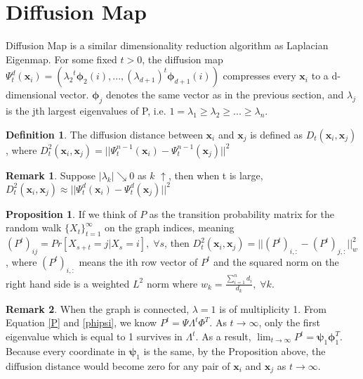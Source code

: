 \documentclass[11pt]{article}
\theoremstyle{definition}
\newtheorem{definition}{Definition}
\newtheorem{remark}{Remark}
\newtheorem{prop}[theorem]{Proposition}
\begin{document}
\section{Diffusion Map}
Diffusion Map \cite{coifman2005geometric}\cite{coifman2006diffusion} is a similar dimensionality reduction algorithm as Laplacian Eigenmap. For some fixed $t>0$, the diffusion map $\Psi_t^d(\boldsymbol{x}_i) = ({\lambda_{2}}^t\boldsymbol{\phi}_2(i), ..., (\lambda_{d+1})^t\boldsymbol{\phi}_{d+1}(i))$ compresses every $\boldsymbol{x}_i$ to a d-dimensional vector. $\boldsymbol{\phi}_{j}$ denotes the same vector as in the previous section, and $\lambda_j$ is the jth largest eigenvalues of P, i.e. $1 = \lambda_1 \geq \lambda_2 \geq ... \geq \lambda_n$.
\begin{definition}
	The diffusion distance between $\boldsymbol{x}_i$ and $\boldsymbol{x}_j$ is defined as $D_t(\boldsymbol{x}_i, \boldsymbol{x}_j)$, where $D_t^2(\boldsymbol{x}_i, \boldsymbol{x}_j) = ||\Psi_t^{n-1}(\boldsymbol{x}_i) - \Psi_t^{n-1}(\boldsymbol{x}_j)||^2$
\end{definition}
\begin{remark}
	Suppose $|\lambda_k| \searrow 0$ as $k$ $\uparrow$, then when t is large, $D_t^2(\boldsymbol{x}_i, \boldsymbol{x}_j) \approx ||\Psi_t^{d}(\boldsymbol{x}_i) - \Psi_t^{d}(\boldsymbol{x}_j)||^2$
\end{remark}
\begin{prop}
\label{diffusion}
If we think of $P$ as the transition probability matrix for the random walk $\{X_t\}_{t=1}^\infty$ on the graph indices, meaning $(P^t)_{ij} = Pr[X_{s+t} = j | X_s = i],\; \forall s$, then $D_t^2(\boldsymbol{x}_i, \boldsymbol{x}_j) = ||(P^t)_{i,:} - (P^t)_{j,:}||_w^2$, where $(P^t)_{i,:}$ means the ith row vector of $P^t$ and the squared norm on the right hand side is a weighted $L^2$ norm where $w_k = \frac{\sum_{i=1}^{n}d_i}{d_k}, \;\forall k$.
\end{prop}
\begin{remark}
When the graph is connected, $\lambda = 1$ is of multiplicity 1. From Equation \ref{P} and \ref{phipsi}, we know $P^t = \Psi \Lambda^t \Phi^T$. As $t \rightarrow \infty$, only the first eigenvalue which is equal to 1 survives in $\Lambda^t$. As a result, $\lim_{t \rightarrow \infty} P^t = \boldsymbol{\psi}_1\boldsymbol{\phi}_1^T$. Because every coordinate in $\boldsymbol{\psi}_1$ is the same, by the Proposition above, the diffusion distance would become zero for any pair of $\boldsymbol{x}_i$ and $\boldsymbol{x}_j$ as $t \rightarrow \infty$.
\end{remark}
\end{document}
